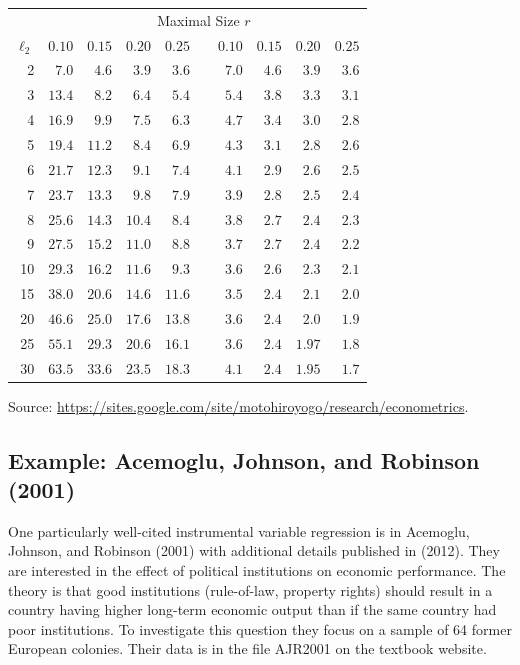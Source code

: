 \documentclass[10pt]{article}
\begin{document}
\begin{tabular}{rrrrrrrrrr}
\hline\hline
 & \multicolumn{9}{c}{Maximal Size $r$} \\
\cline { 2 - 5 }\cline { 7 - 11 }
$\ell_{2}$ & $0.10$ & $0.15$ & $0.20$ & $0.25$ &  & $0.10$ & $0.15$ & $0.20$ & $0.25$ \\
\hline
2 & $7.0$ & $4.6$ & $3.9$ & $3.6$ &  & $7.0$ & $4.6$ & $3.9$ & $3.6$ \\
3 & $13.4$ & $8.2$ & $6.4$ & $5.4$ &  & $5.4$ & $3.8$ & $3.3$ & $3.1$ \\
4 & $16.9$ & $9.9$ & $7.5$ & $6.3$ &  & $4.7$ & $3.4$ & $3.0$ & $2.8$ \\
5 & $19.4$ & $11.2$ & $8.4$ & $6.9$ &  & $4.3$ & $3.1$ & $2.8$ & $2.6$ \\
6 & $21.7$ & $12.3$ & $9.1$ & $7.4$ &  & $4.1$ & $2.9$ & $2.6$ & $2.5$ \\
7 & $23.7$ & $13.3$ & $9.8$ & $7.9$ &  & $3.9$ & $2.8$ & $2.5$ & $2.4$ \\
8 & $25.6$ & $14.3$ & $10.4$ & $8.4$ &  & $3.8$ & $2.7$ & $2.4$ & $2.3$ \\
9 & $27.5$ & $15.2$ & $11.0$ & $8.8$ &  & $3.7$ & $2.7$ & $2.4$ & $2.2$ \\
10 & $29.3$ & $16.2$ & $11.6$ & $9.3$ &  & $3.6$ & $2.6$ & $2.3$ & $2.1$ \\
15 & $38.0$ & $20.6$ & $14.6$ & $11.6$ &  & $3.5$ & $2.4$ & $2.1$ & $2.0$ \\
20 & $46.6$ & $25.0$ & $17.6$ & $13.8$ &  & $3.6$ & $2.4$ & $2.0$ & $1.9$ \\
25 & $55.1$ & $29.3$ & $20.6$ & $16.1$ &  & $3.6$ & $2.4$ & $1.97$ & $1.8$ \\
30 & $63.5$ & $33.6$ & $23.5$ & $18.3$ &  & $4.1$ & $2.4$ & $1.95$ & $1.7$ \\
\hline
\end{tabular}

Source: \href{https://sites.google.com/site/motohiroyogo/research/econometrics}{https://sites.google.com/site/motohiroyogo/research/econometrics}.

\subsection{Example: Acemoglu, Johnson, and Robinson (2001)}
One particularly well-cited instrumental variable regression is in Acemoglu, Johnson, and Robinson (2001) with additional details published in (2012). They are interested in the effect of political institutions on economic performance. The theory is that good institutions (rule-of-law, property rights) should result in a country having higher long-term economic output than if the same country had poor institutions. To investigate this question they focus on a sample of 64 former European colonies. Their data is in the file AJR2001 on the textbook website.
\end{document}
